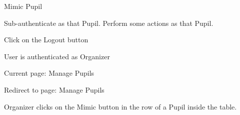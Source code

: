 
\begin{uc}{Mimic Pupil}

    \begin{uc-mss}
    \item Sub-authenticate as that Pupil.  Perform some actions
        as that Pupil.
    \item Click on the Logout button
    \end{uc-mss}

    \begin{uc-pre}
    \item User is authenticated as Organizer
    \item Current page: Manage Pupils
    \end{uc-pre}

    \begin{uc-post}
    \item Redirect to page: Manage Pupils
    \end{uc-post}

    \begin{uc-trig}
        Organizer clicks on the Mimic button in the row of a Pupil inside the
        table.
    \end{uc-trig}

\end{uc}

